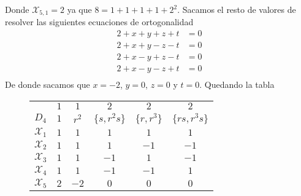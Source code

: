 Donde \(\mathcal{X}_{5,1} = 2\) ya que \(8 = 1+1+1+1+2^{2}\). Sacamos el resto de valores de resolver las siguientes ecuaciones de ortogonalidad
\[
  \begin{aligned}
    2 + x + y + z + t &= 0\\
    2 + x + y - z - t &= 0\\
    2 + x - y + z - t &= 0\\
    2 + x - y - z + t &= 0\\
  \end{aligned}
\]
De donde sacamos que \(x = -2 \), \(y = 0\), \(z = 0\) y \(t = 0\). Quedando la tabla
\begin{figure}[H]
  \centering
  \begin{tabular}{c|ccccc}
    & \(1\) & \(1\) & \(2\) & \(2\) & \(2\) \\
      \(D_{4}\)  & \(1\)  & \(r^{2}\)  & \(\{s, r^{2}s\}\) & \(\{r,r^{3}\}\)  & \(\{rs, r^{3}s\}\) \\ \hline
      \(\mathcal{X}_{1}\) & \(1\)   &  \(1\)    &     \(1\)      &     \(1\)  & \(1\)       \\
      \(\mathcal{X}_{2}\) & \(1\)   &  \(1\)    &     \(1\)      &     \(-1\)  & \(-1\)       \\
      \(\mathcal{X}_{3}\) & \(1\)   &  \(1\)    &     \(-1\)      &     \(1\)  & \(-1\)       \\
      \(\mathcal{X}_{4}\) & \(1\)   &  \(1\)    &     \(-1\)      &     \(-1\)  & \(1\)       \\
      \(\mathcal{X}_{5}\) & \(2\)   &  \(-2\)    &     \(0\)      &     \(0\)  & \(0\)       \\
    \end{tabular}
\end{figure}

